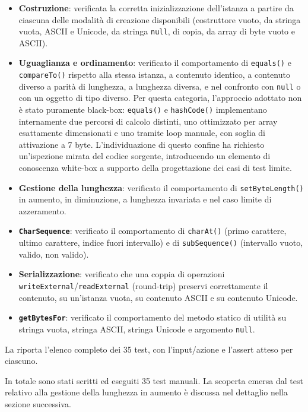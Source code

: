 \begin{itemize}
    \item \textbf{Costruzione}: verificata la corretta inizializzazione
    dell'istanza a partire da ciascuna delle modalità di creazione
    disponibili (costruttore vuoto, da stringa vuota, ASCII e Unicode,
    da stringa \texttt{null}, di copia, da array di byte vuoto e
    ASCII).
    \item \textbf{Uguaglianza e ordinamento}: verificato il
    comportamento di \texttt{equals()} e \texttt{compareTo()} rispetto
    alla stessa istanza, a contenuto identico, a contenuto diverso a
    parità di lunghezza, a lunghezza diversa, e nel confronto con
    \texttt{null} o con un oggetto di tipo diverso. Per questa
    categoria, l'approccio adottato non è stato puramente black-box:
    \texttt{equals()} e \texttt{hashCode()} implementano internamente
    due percorsi di calcolo distinti, uno ottimizzato per array
    esattamente dimensionati e uno tramite loop manuale, con soglia
    di attivazione a 7 byte. L'individuazione di questo confine ha
    richiesto un'ispezione mirata del codice sorgente, introducendo
    un elemento di conoscenza white-box a supporto della
    progettazione dei casi di test limite.
    \item \textbf{Gestione della lunghezza}: verificato il
    comportamento di \texttt{setByteLength()} in aumento, in
    diminuzione, a lunghezza invariata e nel caso limite di
    azzeramento.
    \item \textbf{\texttt{CharSequence}}: verificato il comportamento
    di \texttt{charAt()} (primo carattere, ultimo carattere, indice
    fuori intervallo) e di \texttt{subSequence()} (intervallo vuoto,
    valido, non valido).
    \item \textbf{Serializzazione}: verificato che una coppia di
    operazioni \texttt{writeExternal}/\texttt{readExternal}
    (round-trip) preservi correttamente il contenuto, su un'istanza
    vuota, su contenuto ASCII e su contenuto Unicode.
    \item \textbf{\texttt{getBytesFor}}: verificato il comportamento
    del metodo statico di utilità su stringa vuota, stringa ASCII,
    stringa Unicode e argomento \texttt{null}.
\end{itemize}

La  riporta l'elenco completo dei 35 test,
con l'input/azione e l'assert atteso per ciascuno.

In totale sono stati scritti ed eseguiti 35 test manuali. La scoperta
emersa dal test relativo alla gestione della lunghezza in aumento è
discussa nel dettaglio nella sezione successiva.

